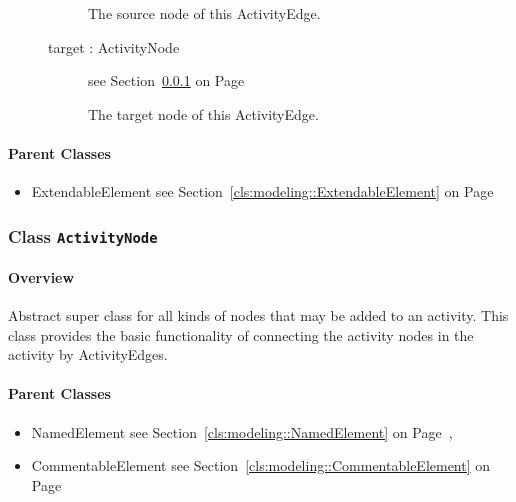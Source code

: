 \begin{description}
\begin{description}
	
			
The source node of this ActivityEdge.	
		
	
\item[target : ActivityNode 	]
see Section~\ref{cls:modeling::activities::ActivityNode} on Page~\pageref{cls:modeling::activities::ActivityNode}\hspace{\fill}
\nopagebreak


	
			
The target node of this ActivityEdge.	
		
	
	\end{description}
	

\end{description}

\paragraph{Parent Classes}
\begin{itemize}
\item ExtendableElement see Section~\ref{cls:modeling::ExtendableElement} on Page~\pageref{cls:modeling::ExtendableElement}\end{itemize}
\subsubsection{\Large{Class \bfseries \texttt{ActivityNode}\normalfont}}
\label{cls:modeling::activities::ActivityNode} 
\paragraph{Overview}

	
			
Abstract super class for all kinds of nodes that may be added to an activity. This class provides the basic functionality of connecting the activity nodes in the activity by ActivityEdges.	
		
	



\paragraph{Parent Classes}
\begin{itemize}
\item NamedElement see Section~\ref{cls:modeling::NamedElement} on Page~\pageref{cls:modeling::NamedElement}, \item CommentableElement see Section~\ref{cls:modeling::CommentableElement} on Page~\pageref{cls:modeling::CommentableElement}\end{itemize}
